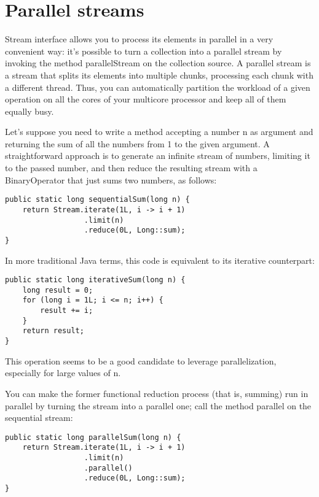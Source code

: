 \section{Parallel streams}

Stream interface allows you to process its elements in parallel in a very convenient way: it’s possible to turn a collection into a parallel stream by invoking the method parallelStream on the collection source. A parallel stream is a stream that splits its elements into multiple chunks, processing each chunk with a different thread. Thus, you can automatically partition the workload of a given operation on all the cores of your multicore processor and keep all of them equally busy.

Let’s suppose you need to write a method accepting a number n as argument and returning the sum of all the numbers from 1 to the given argument. A straightforward approach is to generate an infinite stream of numbers, limiting it to the passed number, and then reduce the resulting stream with a BinaryOperator that just sums two numbers, as follows:

\begin{lstlisting}
public static long sequentialSum(long n) {
	return Stream.iterate(1L, i -> i + 1)
				  .limit(n)
				  .reduce(0L, Long::sum);
}	
\end{lstlisting}

In more traditional Java terms, this code is equivalent to its iterative counterpart:

\begin{lstlisting}
public static long iterativeSum(long n) {
    long result = 0;
    for (long i = 1L; i <= n; i++) {
        result += i;
    }
    return result;
}	
\end{lstlisting}

This operation seems to be a good candidate to leverage parallelization, especially for large values of n.

You can make the former functional reduction process (that is, summing) run in parallel by turning the stream into a parallel one; call the method parallel on the sequential stream:

\begin{lstlisting}
public static long parallelSum(long n) {
	return Stream.iterate(1L, i -> i + 1)
				  .limit(n)
				  .parallel()
				  .reduce(0L, Long::sum);
}	
\end{lstlisting}
